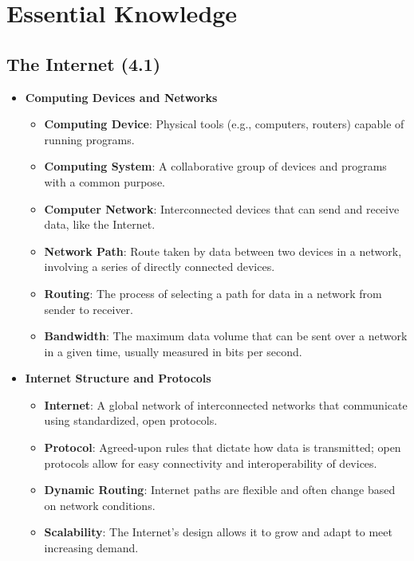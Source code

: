 \section*{Essential Knowledge}

\subsection*{The Internet (4.1)}

\begin{itemize}
    \item \textbf{Computing Devices and Networks}
        \begin{itemize}
            \item \textbf{Computing Device}: Physical tools (e.g., computers, routers) capable of running programs. %
            \item \textbf{Computing System}: A collaborative group of devices and programs with a common purpose. %
            \item \textbf{Computer Network}: Interconnected devices that can send and receive data, like the Internet. %
            \item \textbf{Network Path}: Route taken by data between two devices in a network, involving a series of directly connected devices. %
            \item \textbf{Routing}: The process of selecting a path for data in a network from sender to receiver. %
            \item \textbf{Bandwidth}: The maximum data volume that can be sent over a network in a given time, usually measured in bits per second. %
        \end{itemize}

    \item \textbf{Internet Structure and Protocols}
        \begin{itemize}
            \item \textbf{Internet}: A global network of interconnected networks that communicate using standardized, open protocols. %
            \item \textbf{Protocol}: Agreed-upon rules that dictate how data is transmitted; open protocols allow for easy connectivity and interoperability of devices. %
            \item \textbf{Dynamic Routing}: Internet paths are flexible and often change based on network conditions. %
            \item \textbf{Scalability}: The Internet’s design allows it to grow and adapt to meet increasing demand. %
        \end{itemize}


\end{itemize}
